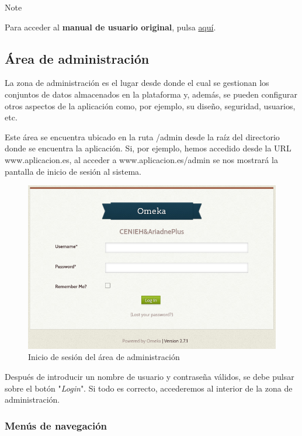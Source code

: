 \documentclass[
]{article}
\begin{document}
Note

Para acceder al \textbf{manual de usuario original}, pulsa
\href{https://omeka.org/classic/docs/}{aquí}.

\hypertarget{uxe1rea-de-administraciuxf3n}{%
\subsection{Área de administración}\label{uxe1rea-de-administraciuxf3n}}

La zona de administración es el lugar desde donde el cual se gestionan
los conjuntos de datos almacenados en la plataforma y, además, se pueden
configurar otros aspectos de la aplicación como, por ejemplo, su diseño,
seguridad, usuarios, etc.

Este área se encuentra ubicado en la ruta {/admin} desde la raíz del
directorio donde se encuentra la aplicación. Si, por ejemplo, hemos
accedido desde la URL {www.aplicacion.es}, al acceder a
{www.aplicacion.es/admin} se nos mostrará la pantalla de inicio de
sesión al sistema.

\begin{figure}
\hypertarget{admin-login}{%
\centering
\includegraphics{../_static/images/admin-login.png}
\caption{Inicio de sesión del área de administración}\label{admin-login}
}
\end{figure}

Después de introducir un nombre de usuario y contraseña válidos, se debe
pulsar sobre el botón "\emph{Login}". Si todo es correcto, accederemos
al interior de la zona de administración.

\hypertarget{menuxfas-de-navegaciuxf3n}{%
\subsubsection{Menús de navegación}\label{menuxfas-de-navegaciuxf3n}}
\end{document}
